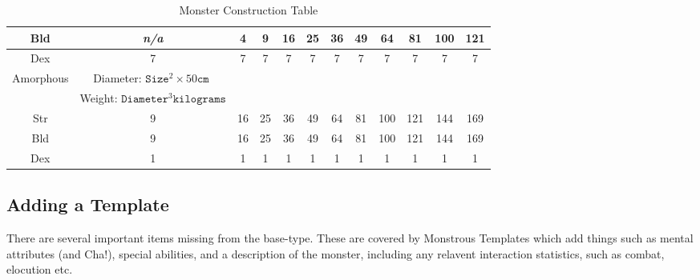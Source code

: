 \documentclass[twoside]{book}
\begin{document}
\begin{table}[htb]
\begin{center}
\begin{tabular}{|c|c|c|c|c|c|c|c|c|c|c|c|}
 Bld &
                    \textit{n/a}
                  & 4 & 9 & 16 & 25 & 36 & 49 & 64 & 81 & 100 & 121 \\

\hline

 Dex & 7 & 7 & 7 & 7 & 7 & 7 & 7 & 7 & 7 & 7 & 7 \\

\hline

 Amorphous &  Diameter: \begin{math}  
                        {\texttt{Size}}^{ 2 }   \times   50 \texttt{cm
                          }  \end{math}
                  \\

\hline

& Weight: \begin{math}  
                        {\texttt{Diameter}}^{ 3 }  \texttt{kilograms}  \end{math}  
                  \\

\hline

 Str & 9 & 16 & 25 & 36 & 49 & 64 & 81 & 100 & 121 & 144 & 169 \\

\hline

 Bld & 9 & 16 & 25 & 36 & 49 & 64 & 81 & 100 & 121 & 144 & 169 \\

\hline

 Dex & 1 & 1 & 1 & 1 & 1 & 1 & 1 & 1 & 1 & 1 & 1 \\

\hline


  \end{tabular}
  
\caption{Monster Construction Table}
  
  \end{center}
\end{table}
  
    

\subsection{Adding a Template}
     There are several important items missing from the
               base-type. These are covered by Monstrous Templates which
               add things such as mental attributes (and Cha!), special
               abilities, and a description of the monster, including any
               relavent interaction statistics, such as combat, elocution
               etc. 
    
\end{document}
